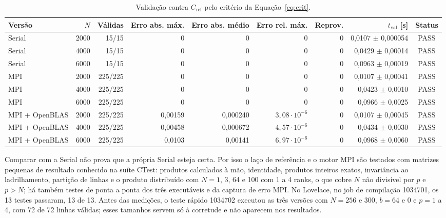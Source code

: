 \documentclass[Portugues]{ic-tese-v3}
\DeclareRobustCommand{\_}{\textunderscore\allowbreak} %
\begin{document}
\begin{table}[H]
\centering\footnotesize
\renewcommand{\arraystretch}{1.05}\setlength{\tabcolsep}{3pt}
\begin{tabular}{|l|r|r|r|r|r|r|r|c|}
\hline
\textbf{Versão} & \textbf{$N$} & \textbf{Válidas} & \textbf{Erro abs. máx.} & \textbf{Erro abs. médio} & \textbf{Erro rel. máx.} & \textbf{Reprov.} & \textbf{$t_{\mathrm{val}}$ [s]} & \textbf{Status} \\
\hline\hline
Serial & 2000 & 15/15 & 0 & 0 & 0 & 0 & 0,0107 $\pm$ 0,000054 & PASS \\ \hline
Serial & 4000 & 15/15 & 0 & 0 & 0 & 0 & 0,0429 $\pm$ 0,00014 & PASS \\ \hline
Serial & 6000 & 15/15 & 0 & 0 & 0 & 0 & 0,0963 $\pm$ 0,00019 & PASS \\ \hline\hline
MPI & 2000 & 225/225 & 0 & 0 & 0 & 0 & 0,0107 $\pm$ 0,00041 & PASS \\ \hline
MPI & 4000 & 225/225 & 0 & 0 & 0 & 0 & 0,0423 $\pm$ 0,0010 & PASS \\ \hline
MPI & 6000 & 225/225 & 0 & 0 & 0 & 0 & 0,0966 $\pm$ 0,0025 & PASS \\ \hline\hline
MPI + OpenBLAS & 2000 & 225/225 & 0,00159 & 0,000240 & $3{,}08\cdot10^{-6}$ & 0 & 0,0107 $\pm$ 0,00045 & PASS \\ \hline
MPI + OpenBLAS & 4000 & 225/225 & 0,00458 & 0,000672 & $4{,}57\cdot10^{-6}$ & 0 & 0,0434 $\pm$ 0,0030 & PASS \\ \hline
MPI + OpenBLAS & 6000 & 225/225 & 0,0103 & 0,00141 & $6{,}97\cdot10^{-6}$ & 0 & 0,0968 $\pm$ 0,0060 & PASS \\ \hline
\end{tabular}
\caption{Validação contra $C_{\mathrm{ref}}$ pelo critério da Equação~\eqref{eq:crit}.}
\label{tab:val}
\end{table}

Comparar com a Serial não prova que a própria Serial esteja certa. Por isso o laço de referência e o motor MPI são testados com matrizes pequenas de resultado conhecido na suíte CTest: produtos calculados à mão, identidade, produtos inteiros exatos, invariância ao ladrilhamento, partição de linhas e o produto distribuído com $N=1$, 3, 64 e 100 com 1 a 4 ranks, o que cobre $N$ não divisível por $p$ e $p>N$; há também testes de ponta a ponta dos três executáveis e da captura de erro MPI. No Lovelace, no job de compilação 1034701, os 13 testes passaram, 13 de 13. Antes das medições, o teste rápido 1034702 executou as três versões com $N=256$ e 300, $b=64$ e 0 e $p=1$ a 4, com 72 de 72 linhas válidas; esses tamanhos servem só à corretude e não aparecem nos resultados.
\end{document}
